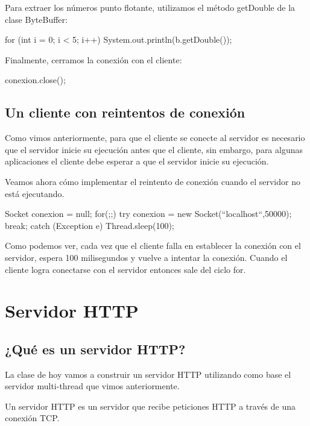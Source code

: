 \documentclass[11pt,a4paper,oneside]{book}
\begin{document}
Para extraer los números punto flotante, utilizamos el método getDouble de la clase ByteBuffer:

\begin{SourceCode}
for (int i = 0; i < 5; i++) System.out.println(b.getDouble());    
\end{SourceCode}

Finalmente, cerramos la conexión con el cliente:

\begin{SourceCode}
conexion.close();
\end{SourceCode}

\section{Un cliente con reintentos de conexión}

Como vimos anteriormente, para que el cliente se conecte al servidor es necesario que el servidor inicie su ejecución antes que el cliente, sin embargo, para algunas aplicaciones el cliente debe esperar a que el servidor inicie su ejecución.

Veamos ahora cómo implementar el reintento de conexión cuando el servidor no está ejecutando.

\begin{SourceCode}
Socket conexion = null;
for(;;)
  try
  {
    conexion = new Socket(``localhost``,50000);
    break;
  }
  catch (Exception e)
  {
    Thread.sleep(100);
  }
\end{SourceCode}

Como podemos ver, cada vez que el cliente falla en establecer la conexión con el servidor, espera 100 milisegundos y vuelve a intentar la conexión. Cuando el cliente logra conectarse con el servidor entonces sale del ciclo for.

\chapter{Servidor HTTP}

\section{¿Qué es un servidor HTTP?}

La clase de hoy vamos a construir un servidor HTTP utilizando como base el servidor multi-thread que vimos anteriormente.

Un servidor HTTP es un servidor que recibe peticiones HTTP a través de una conexión TCP.
\end{document}
